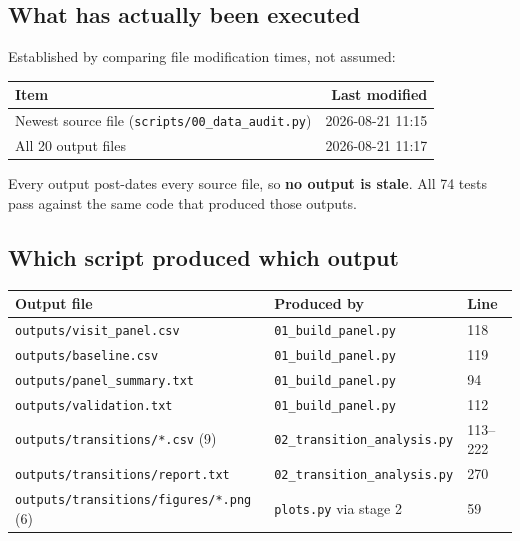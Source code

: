 \documentclass[11pt,a4paper]{article}
\newcommand{\code}[1]{\texttt{\small #1}}
\begin{document}
\subsection{What has actually been executed}

Established by comparing file modification times, not assumed:

\begin{table}[h]
\centering
\begin{tabular}{@{}lr@{}}
\toprule
\textbf{Item} & \textbf{Last modified} \\
\midrule
Newest source file (\code{scripts/00\_data\_audit.py}) & 2026-08-21 11:15 \\
All 20 output files                                    & 2026-08-21 11:17 \\
\bottomrule
\end{tabular}
\end{table}

\noindent
Every output post-dates every source file, so \textbf{no output is stale}. All
74 tests pass against the same code that produced those outputs.

\subsection{Which script produced which output}

\begin{table}[h]
\centering
\small
\begin{tabular}{@{}lll@{}}
\toprule
\textbf{Output file} & \textbf{Produced by} & \textbf{Line} \\
\midrule
\code{outputs/visit\_panel.csv}          & \code{01\_build\_panel.py} & 118 \\
\code{outputs/baseline.csv}              & \code{01\_build\_panel.py} & 119 \\
\code{outputs/panel\_summary.txt}        & \code{01\_build\_panel.py} & 94 \\
\code{outputs/validation.txt}            & \code{01\_build\_panel.py} & 112 \\
\code{outputs/transitions/*.csv} (9)     & \code{02\_transition\_analysis.py} & 113--222 \\
\code{outputs/transitions/report.txt}    & \code{02\_transition\_analysis.py} & 270 \\
\code{outputs/transitions/figures/*.png} (6) & \code{plots.py} via stage 2 & 59 \\
\bottomrule
\end{tabular}
\end{table}
\end{document}

